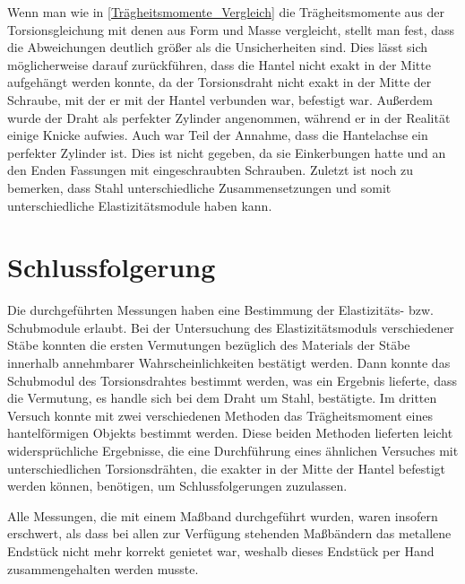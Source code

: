 \documentclass[
	a4paper,
	12pt,
	pagesize,
	ngerman
]{scrartcl}
\begin{document}
	Wenn man wie in \cref{Trägheitsmomente_Vergleich} die Trägheitsmomente aus der Torsionsgleichung mit denen aus Form und Masse vergleicht, stellt man fest, dass die Abweichungen deutlich größer als die Unsicherheiten sind.
	Dies lässt sich möglicherweise darauf zurückführen, dass die Hantel nicht exakt in der Mitte aufgehängt werden konnte, da der Torsionsdraht nicht exakt in der Mitte der Schraube, mit der er mit der Hantel verbunden war, befestigt war.
	Außerdem wurde der Draht als perfekter Zylinder angenommen, während er in der Realität einige Knicke aufwies.
	Auch war Teil der Annahme, dass die Hantelachse ein perfekter Zylinder ist.
	Dies ist nicht gegeben, da sie Einkerbungen hatte und an den Enden Fassungen mit eingeschraubten Schrauben.
	Zuletzt ist noch zu bemerken, dass Stahl unterschiedliche Zusammensetzungen und somit unterschiedliche  Elastizitätsmodule haben kann.
	
	\section{Schlussfolgerung}
	Die durchgeführten Messungen haben eine Bestimmung der Elastizitäts- bzw. Schubmodule erlaubt.
	Bei der Untersuchung des Elastizitätsmoduls verschiedener Stäbe konnten die ersten Vermutungen bezüglich des Materials der Stäbe innerhalb annehmbarer Wahrscheinlichkeiten bestätigt werden.
	Dann konnte das Schubmodul des Torsionsdrahtes bestimmt werden, was ein Ergebnis lieferte, dass die Vermutung, es handle sich bei dem Draht um Stahl, bestätigte.
	Im dritten Versuch konnte mit zwei verschiedenen Methoden das Trägheitsmoment eines hantelförmigen Objekts bestimmt werden.
	Diese beiden Methoden lieferten leicht widersprüchliche Ergebnisse, die eine Durchführung eines ähnlichen Versuches mit unterschiedlichen Torsionsdrähten, die exakter in der Mitte der Hantel befestigt werden können, benötigen, um Schlussfolgerungen zuzulassen. \par
	Alle Messungen, die mit einem Maßband durchgeführt wurden, waren insofern erschwert, als dass bei allen zur Verfügung stehenden Maßbändern das metallene Endstück nicht mehr korrekt genietet war, weshalb dieses Endstück per Hand zusammengehalten werden musste.
	\printbibliography
\end{document}
